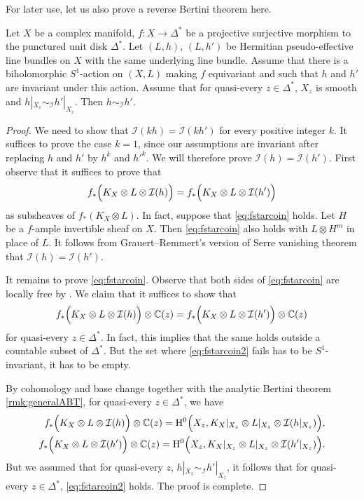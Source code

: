 For later use, let us also prove a reverse Bertini theorem here.
\begin{lemma}\label{lma:fibIeq}
Let $X$ be a complex manifold, $f\colon X\rightarrow \Delta^*$ be a projective surjective morphism to the punctured unit disk $\Delta^*$. Let $(L,h)$, $(L,h')$ be Hermitian pseudo-effective line bundles on $X$ with the same underlying line bundle. Assume that there is a biholomorphic $S^1$-action on $(X,L)$ making $f$ equivariant and such that $h$ and $h'$ are invariant under this action.
Assume that for quasi-every $z\in \Delta^*$, $X_z$ is smooth and $h|_{X_z}\sim_{\mathcal{I}}h'|_{X_z}$. Then $h\sim_{\mathcal{I}}h'$.
\end{lemma}
\begin{proof}
We need to show that $\mathcal{I}(kh)=\mathcal{I}(kh')$ for every positive integer $k$. It suffices to prove the case $k=1$, since our assumptions are invariant after replacing $h$ and $h'$ by $h^k$ and $h'^k$. We will therefore prove $\mathcal{I}(h)=\mathcal{I}(h')$. First observe that it suffices to prove that
\begin{equation}\label{eq:fstarcoin}
f_*\Bigl(K_{X}\otimes L\otimes \mathcal{I}(h)\Bigr)=f_*\Bigl(K_{X}\otimes L\otimes \mathcal{I}(h')\Bigr)
\end{equation}
as subsheaves of $f_*(K_{X}\otimes L)$. In fact, suppose that \eqref{eq:fstarcoin} holds. Let $H$ be a $f$-ample invertible sheaf on $X$. Then \eqref{eq:fstarcoin} also holds with $L\otimes H^m$ in place of $L$. It follows from Grauert--Remmert's version of Serre vanishing theorem \cite[Theorem~2.1(A)]{BS76} that $\mathcal{I}(h)=\mathcal{I}(h')$.

It remains to prove \eqref{eq:fstarcoin}. Observe that both sides of \eqref{eq:fstarcoin} are locally free by \cite[Corollary~1.5]{Mat16}. We claim that it suffices to show that
\begin{equation}\label{eq:fstarcoin2}
f_*\Bigl(K_{X}\otimes L\otimes \mathcal{I}(h)\Bigr) \otimes \mathbb{C}(z)=f_*\Bigl(K_{X}\otimes L\otimes \mathcal{I}(h')\Bigr) \otimes \mathbb{C}(z)
\end{equation}
for quasi-every $z\in \Delta^*$.
In fact, this implies that the same holds outside a countable subset of $\Delta^*$. But the set where \eqref{eq:fstarcoin2} fails has to be $S^1$-invariant, it has to be empty.


By cohomology and base change together with the analytic Bertini theorem \cref{rmk:generalABT}, for quasi-every $z\in \Delta^*$, we have
\[
\begin{split}
f_*\Bigl(K_{X}\otimes L\otimes \mathcal{I}(h)\Bigr) \otimes \mathbb{C}(z)=\mathrm{H}^0\Bigl(X_z,K_{X}|_{X_z}\otimes L|_{X_z}\otimes \mathcal{I}(h|_{X_z})\Bigr),\\
f_*\Bigl(K_{X}\otimes L\otimes \mathcal{I}(h')\Bigr) \otimes \mathbb{C}(z)=\mathrm{H}^0\Bigl(X_z,K_{X}|_{X_z}\otimes L|_{X_z}\otimes \mathcal{I}(h'|_{X_z})\Bigr).
\end{split}
\]
But we assumed that for quasi-every $z$, $h|_{X_z}\sim_{\mathcal{I}}h'|_{X_z}$, it follows that for quasi-every $z\in \Delta^*$, \eqref{eq:fstarcoin2} holds. The proof is complete.
\end{proof}
